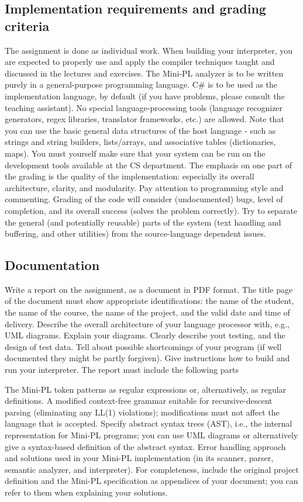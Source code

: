 \documentclass[english,11pt,twoside,a4paper]{article}
\begin{document}
\subsection{Implementation requirements and grading criteria}

The assignment is done as individual work. When building your interpreter, you are expected to properly use and apply the compiler techniques taught and discussed in the lectures and exercises. The Mini-PL analyzer is to be written purely in a general-purpose programming language. C\# is to be used as the implementation language, by default (if you have problems, please consult the teaching assistant). No special language-processing tools (language recognizer generators, regex libraries, translator frameworks, etc.) are allowed. Note that you can use the basic general data structures of the host language - such as strings and string builders, lists/arrays, and associative tables (dictionaries, maps). You must yourself make sure that your system can be run on the development tools available at the CS department.
The emphasis on one part of the grading is the quality of the implementation: especially its overall architecture, clarity, and modularity. Pay attention to programming style and commenting. Grading of the code will consider (undocumented) bugs, level of completion, and its overall success (solves the problem correctly). Try to separate the general (and potentially reusable) parts of the system (text handling and buffering, and other utilities) from the source-language dependent issues.

\subsection{Documentation}

Write a report on the assignment, as a document in PDF format. The title page of the document must show appropriate identifications: the name of the student, the name of the course, the name of the project, and the valid date and time of delivery.
Describe the overall architecture of your language processor with, e.g., UML diagrams. Explain your diagrams. Clearly describe yout testing, and the design of test data. Tell about possible shortcomings of your program (if well documented they might be partly forgiven). Give instructions how to build and run your interpreter. The report must include the following parts

The Mini-PL token patterns as regular expressions or, alternatively, as regular definitions.
A modified context-free grammar suitable for recursive-descent parsing (eliminating any LL(1) violations); modifications must not affect the language that is accepted.
Specify abstract syntax trees (AST), i.e., the internal representation for Mini-PL programs; you can use UML diagrams or alternatively give a syntax-based definition of the abstract syntax.
Error handling approach and solutions used in your Mini-PL implementation (in its scanner, parser, semantic analyzer, and interpreter).
For completeness, include the original project definition and the Mini-PL specification as appendices of your document; you can refer to them when explaining your solutions.
\end{document}
